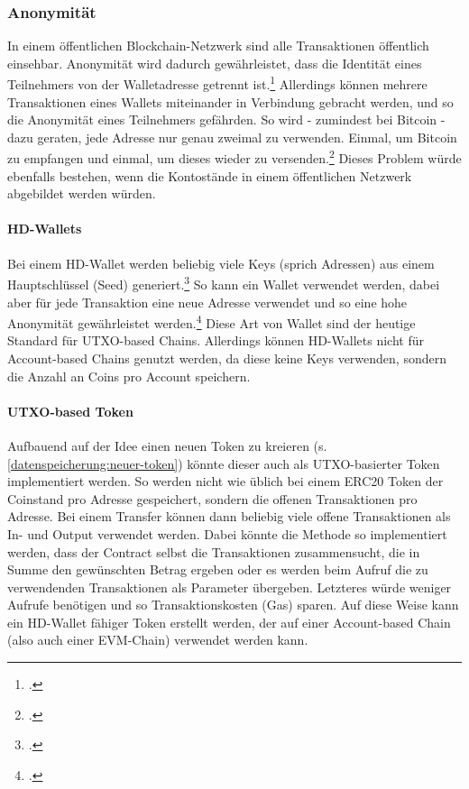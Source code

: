 \subsubsection{Anonymität}
\label{sec:Anonymität}
In einem öffentlichen Blockchain-Netzwerk sind alle Transaktionen öffentlich einsehbar.
Anonymität wird dadurch gewährleistet, dass die Identität eines Teilnehmers von der Walletadresse getrennt ist.\footcite[Vgl.][6]{q4}
Allerdings können mehrere Transaktionen eines Wallets miteinander in Verbindung gebracht werden, und so die Anonymität eines Teilnehmers gefährden. 
So wird - zumindest bei Bitcoin - dazu geraten, jede Adresse nur genau zweimal zu verwenden. Einmal, um Bitcoin zu empfangen und einmal, um dieses wieder zu versenden.\footcite[Vgl.][]{w15}
Dieses Problem würde ebenfalls bestehen, wenn die Kontostände in einem öffentlichen Netzwerk abgebildet werden würden.



\paragraph{HD-Wallets}
Bei einem HD-Wallet werden beliebig viele Keys (sprich Adressen) aus einem Hauptschlüssel (Seed) generiert.\footcite[Vgl. hierzu und weiterführend][S. 8 ff\adddot]{q9}
So kann ein Wallet verwendet werden, dabei aber für jede Transaktion eine neue Adresse verwendet und so eine hohe Anonymität gewährleistet werden.\footcite[Vgl.][231]{q5}
Diese Art von Wallet sind der heutige Standard für UTXO-based Chains.
Allerdings können HD-Wallets nicht für Account-based Chains genutzt werden, da diese keine Keys verwenden, sondern die Anzahl an Coins pro Account speichern.

\paragraph{UTXO-based Token}
Aufbauend auf der Idee einen neuen Token zu kreieren (s. \ref{datenspeicherung:neuer-token}) könnte dieser auch als UTXO-basierter Token implementiert werden.
So werden nicht wie üblich bei einem ERC20 Token der Coinstand pro Adresse gespeichert, sondern die offenen Transaktionen pro Adresse.
Bei einem Transfer können dann beliebig viele offene Transaktionen als In- und Output verwendet werden.
Dabei könnte die Methode so implementiert werden, dass der Contract selbst die Transaktionen zusammensucht, die in Summe den gewünschten Betrag ergeben oder es werden beim Aufruf die zu verwendenden Transaktionen als Parameter übergeben.
Letzteres würde weniger Aufrufe benötigen und so Transaktionskosten (Gas) sparen.
Auf diese Weise kann ein HD-Wallet fähiger Token erstellt werden, der auf einer Account-based Chain (also auch einer EVM-Chain) verwendet werden kann.